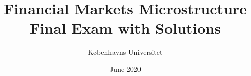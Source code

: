 \documentclass[11pt
, answers
]{exam}
\begin{document}
	
	\title{Financial Markets Microstructure\\
		Final Exam with Solutions}
	\author{K{\o}benhavns Universitet}
	\date{June 2020}
	\maketitle
	
	
	
\end{document}
